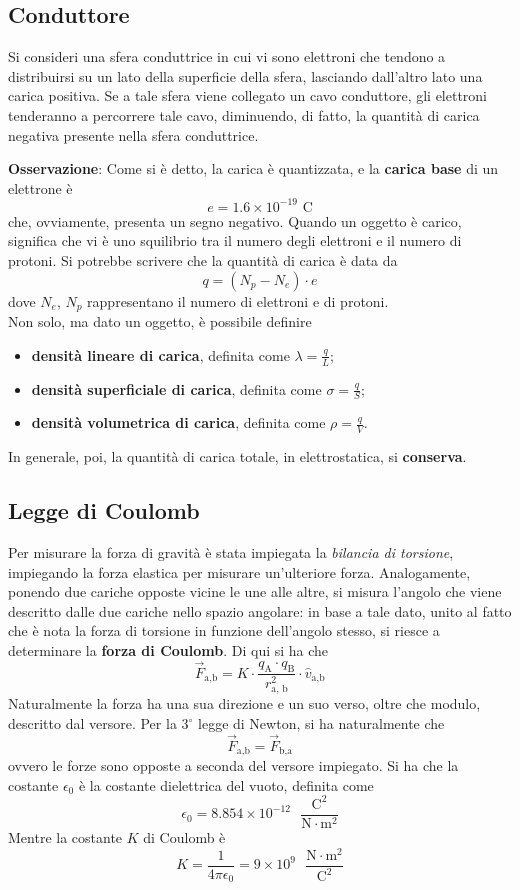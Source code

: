 \documentclass[a4paper]{extarticle}
\begin{document}
\subsection{Conduttore}
Si consideri una sfera conduttrice in cui vi sono elettroni che tendono a distribuirsi su un lato della superficie della sfera, lasciando dall'altro lato una carica positiva.
Se a tale sfera viene collegato un cavo conduttore, gli elettroni tenderanno a percorrere tale cavo, diminuendo, di fatto, la quantità di carica negativa presente nella sfera conduttrice.

\vspace{1em}
\noindent
\textbf{Osservazione}: Come si è detto, la carica è quantizzata, e la \textbf{carica base} di un elettrone è
\[\boxed{e = 1.6 \times 10^{-19} \text{ C}}\]
che, ovviamente, presenta un segno negativo. Quando un oggetto è carico, significa che vi è uno squilibrio tra il numero degli elettroni e il numero di protoni.
Si potrebbe scrivere che la quantità di carica è data da
\[q= \left(N_p - N_e\right) \cdot e\]
dove $N_e$, $N_p$ rappresentano il numero di elettroni e di protoni.\\
Non solo, ma dato un oggetto, è possibile definire
\begin{itemize}
  \item \textbf{densità lineare di carica}, definita come $\lambda = \frac{q}{L}$;
  \item \textbf{densità superficiale di carica}, definita come $\sigma = \frac{q}{S}$;
  \item \textbf{densità volumetrica di carica}, definita come $\rho = \frac{q}{V}$.
\end{itemize}
In generale, poi, la quantità di carica totale, in elettrostatica, si \textbf{conserva}.

\vspace{1em}
\noindent
\subsection{Legge di Coulomb}
Per misurare la forza di gravità è stata impiegata la \textit{bilancia di torsione}, impiegando la forza elastica per misurare un'ulteriore forza.
Analogamente, ponendo due cariche opposte vicine le une alle altre, si misura l'angolo che viene descritto dalle due cariche nello spazio angolare: in base a tale dato, unito al fatto che è nota la forza di torsione in funzione dell'angolo stesso, si riesce a determinare la \textbf{forza di Coulomb}.
Di qui si ha che
\[\boxed{\vec{F}_{\text{a,b}} = K \cdot \frac{q_\text{A} \cdot q_\text{B}}{r_{\text{a, b}}^2} \cdot \hat{v}_{\text{a,b}}}\]
Naturalmente la forza ha una sua direzione e un suo verso, oltre che modulo, descritto dal versore.
Per la $3^{\circ}$ legge di Newton, si ha naturalmente che
\[\vec{F}_{\text{a,b}} = \vec{F}_{\text{b,a}}\]
ovvero le forze sono opposte a seconda del versore impiegato. Si ha che la costante $\epsilon_0$ è la costante dielettrica del vuoto, definita come
\[\epsilon_0 = 8.854 \times 10^{-12} \text{ } \frac{\text{C}^2}{\text{N} \cdot \text{m}^2}\]
Mentre la costante $K$ di Coulomb è 
\[\boxed{K = \frac{1}{4 \pi \epsilon_0} = 9 \times 10^{9} \text{ } \frac{\text{N} \cdot \text{m}^2}{\text{C}^2}}\]
\end{document}
